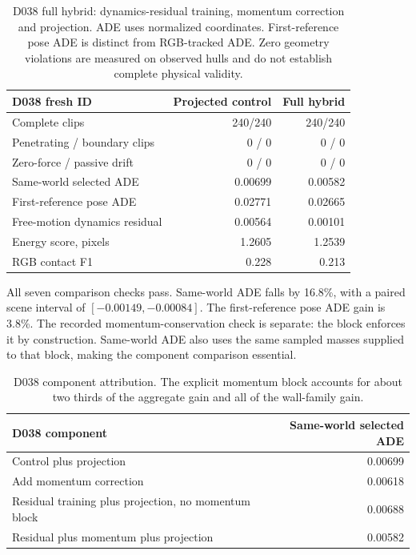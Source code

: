 \begin{table}[!ht]
\centering
\begin{tabular}{lrr}
\hline
D038 fresh ID & Projected control & Full hybrid \\
\hline
Complete clips & 240/240 & 240/240 \\
Penetrating / boundary clips & 0 / 0 & 0 / 0 \\
Zero-force / passive drift & 0 / 0 & 0 / 0 \\
Same-world selected ADE & 0.00699 & 0.00582 \\
First-reference pose ADE & 0.02771 & 0.02665 \\
Free-motion dynamics residual & 0.00564 & 0.00101 \\
Energy score, pixels & 1.2605 & 1.2539 \\
RGB contact F1 & 0.228 & 0.213 \\
\hline
\end{tabular}
\caption{D038 full hybrid: dynamics-residual training, momentum correction and
projection. ADE uses normalized coordinates. First-reference pose ADE is
distinct from RGB-tracked ADE. Zero geometry violations are measured on
observed hulls and do not establish complete physical validity.}
\label{tab:dynamics-residual}
\end{table}

All seven comparison checks pass. Same-world ADE falls by 16.8\%, with a
paired scene interval of $[-0.00149,-0.00084]$. The first-reference pose ADE
gain is 3.8\%. The recorded momentum-conservation check is separate: the block
enforces it by construction. Same-world ADE also uses the same sampled
masses supplied to that block, making the component comparison essential.

\begin{table}[!ht]
\centering
\begin{tabular}{lr}
\hline
D038 component & Same-world selected ADE \\
\hline
Control plus projection & 0.00699 \\
Add momentum correction & 0.00618 \\
Residual training plus projection, no momentum block & 0.00688 \\
Residual plus momentum plus projection & 0.00582 \\
\hline
\end{tabular}
\caption{D038 component attribution. The explicit momentum block accounts for
about two thirds of the aggregate gain and all of the wall-family gain.}
\label{tab:dynamics-components}
\end{table}

